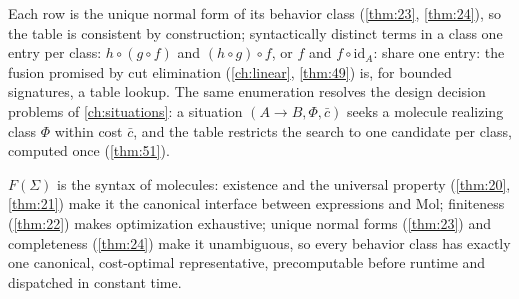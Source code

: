 Each row is the unique normal form of its behavior class (\autoref{thm:23}, \autoref{thm:24}), so the
table is consistent by construction; syntactically distinct terms in a class
one entry per class: $h \circ (g \circ f)$ and $(h \circ g) \circ f$, or $f$ and
$f \circ \mathrm{id}_A$: share one entry: the fusion promised by cut
elimination (\autoref{ch:linear}, \autoref{thm:49}) is, for bounded signatures, a table
lookup. The same enumeration resolves the design decision problems of
\autoref{ch:situations}: a situation $(A \to B, \Phi, \bar{c})$ seeks a
molecule realizing class $\Phi$ within cost $\bar{c}$, and the table restricts
the search to one candidate per class, computed once (\autoref{thm:51}).

\begin{remark}[Summary]
$F (\Sigma)$ is the syntax of molecules: existence and the universal property
(\autoref{thm:20}, \autoref{thm:21}) make it the canonical interface between expressions and Mol;
finiteness (\autoref{thm:22}) makes optimization exhaustive; unique normal forms (\autoref{thm:23})
and completeness (\autoref{thm:24}) make it unambiguous, so every behavior class has
exactly one canonical, cost-optimal representative, precomputable before
runtime and dispatched in constant time.
\end{remark}
